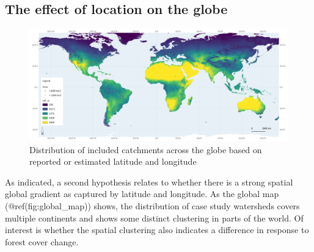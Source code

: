 \documentclass[]{elsarticle} %
\begin{document}
\hypertarget{the-effect-of-location-on-the-globe}{%
\subsection{The effect of location on the
globe}\label{the-effect-of-location-on-the-globe}}

\begin{figure}
\includegraphics[width=0.9\linewidth]{../../data/FAOET0data2} \caption{Distribution of included catchments across the globe based on reported or estimated latitude and longitude}\label{fig:global_map}
\end{figure}

As indicated, a second hypothesis relates to whether there is a strong
spatial global gradient as captured by latitude and longitude. As the
global map (@ref(fig:global\_map)) shows, the distribution of case study
watersheds covers multiple continents and shows some distinct clustering
in parts of the world. Of interest is whether the spatial clustering
also indicates a difference in response to forest cover change.
\end{document}
